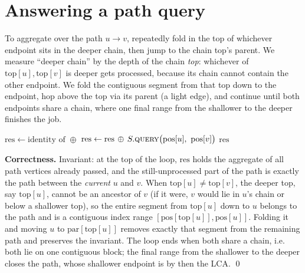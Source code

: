 \section{Answering a path query}
\label{ch19:pathquery}

To aggregate over the path $u\!\to\!v$, repeatedly fold in the top of whichever endpoint sits in the
deeper chain, then jump to the chain top's parent. We measure ``deeper chain'' by the depth of the
chain \emph{top}: whichever of $\mathrm{top}[u],\mathrm{top}[v]$ is deeper gets processed, because its
chain cannot contain the other endpoint. We fold the contiguous segment from that top down to the
endpoint, hop above the top via its parent (a light edge), and continue until both endpoints share a
chain, where one final range from the shallower to the deeper finishes the job.

\begin{algorithm}[H]
\caption{\textsc{PathQuery}$(u,v)$ over vertex values}
\label{ch19:alg-query}
\DontPrintSemicolon
{}
$\mathrm{res}\gets \text{identity of }\oplus$\;
$\mathrm{res}\gets \mathrm{res}\,\oplus\, S.\textsc{query}\big(\mathrm{pos}[u],\ \mathrm{pos}[v]\big)$\;
\Return $\mathrm{res}$\;
\end{algorithm}

\begin{whybox}
\textbf{Correctness.} Invariant: at the top of the loop, $\mathrm{res}$ holds the aggregate of all path
vertices already passed, and the still-unprocessed part of the path is exactly the path between the
\emph{current} $u$ and $v$. When $\mathrm{top}[u]\ne\mathrm{top}[v]$, the deeper top, say
$\mathrm{top}[u]$, cannot be an ancestor of $v$ (if it were, $v$ would lie in $u$'s chain or below a
shallower top), so the entire segment from $\mathrm{top}[u]$ down to $u$ belongs to the path and is a
contiguous index range $[\mathrm{pos}[\mathrm{top}[u]],\mathrm{pos}[u]]$. Folding it and moving $u$ to
$\mathrm{par}[\mathrm{top}[u]]$ removes exactly that segment from the remaining path and preserves the
invariant. The loop ends when both share a chain, i.e. both lie on one contiguous block; the final
range from the shallower to the deeper closes the path, whose shallower endpoint is by then the LCA. \qed
\end{whybox}

